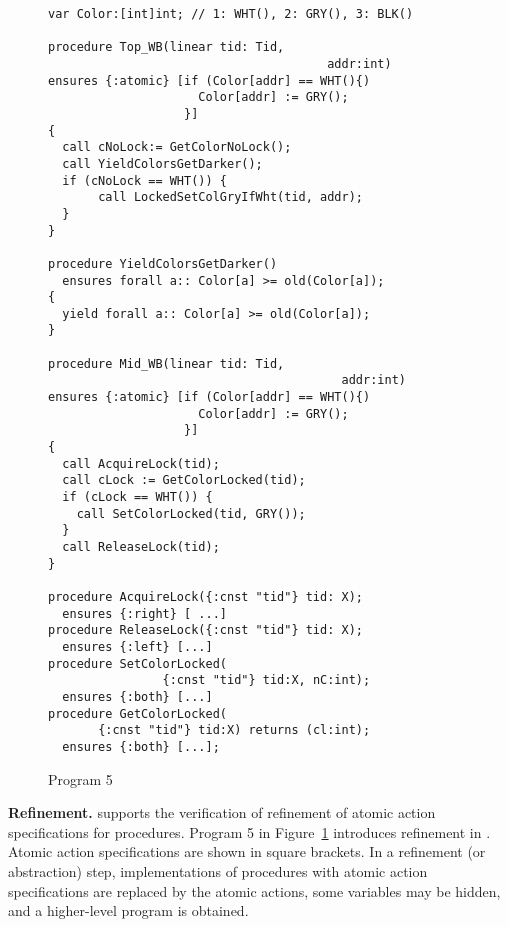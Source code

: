 \begin{figure}
\begin{verbatim}
var Color:[int]int; // 1: WHT(), 2: GRY(), 3: BLK()

procedure Top_WB(linear tid: Tid,
                                       addr:int)
ensures {:atomic} [if (Color[addr] == WHT(){)
                     Color[addr] := GRY();
                   }]
{
  call cNoLock:= GetColorNoLock();
  call YieldColorsGetDarker(); 
  if (cNoLock == WHT()) {
       call LockedSetColGryIfWht(tid, addr);
  }
}

procedure YieldColorsGetDarker()
  ensures forall a:: Color[a] >= old(Color[a]);
{
  yield forall a:: Color[a] >= old(Color[a]);
}

procedure Mid_WB(linear tid: Tid,
                                         addr:int)
ensures {:atomic} [if (Color[addr] == WHT(){)
                     Color[addr] := GRY();
                   }]
{
  call AcquireLock(tid);
  call cLock := GetColorLocked(tid);
  if (cLock == WHT()) {
    call SetColorLocked(tid, GRY());
  } 
  call ReleaseLock(tid);
}

procedure AcquireLock({:cnst "tid"} tid: X);
  ensures {:right} [ ...]
procedure ReleaseLock({:cnst "tid"} tid: X);
  ensures {:left} [...]
procedure SetColorLocked(
                {:cnst "tid"} tid:X, nC:int); 
  ensures {:both} [...]
procedure GetColorLocked(
       {:cnst "tid"} tid:X) returns (cl:int);
  ensures {:both} [...];

\end{verbatim}
\caption{Program 5}
\label{fig:reft}
\end{figure}

%

{\bf Refinement.} 
\civl supports the verification of refinement of atomic action specifications for
procedures. Program 5 in Figure~\ref{fig:reft} introduces refinement in \civl. 
Atomic action specifications are shown in square brackets. 
In a refinement (or abstraction) step, implementations of procedures with atomic action
specifications are replaced by the atomic actions, some variables may
be hidden, and a higher-level program is obtained. 

